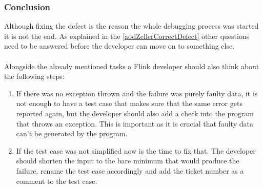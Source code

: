 \subsubsection{Conclusion}
Although fixing the defect is the reason the whole debugging process was started it is not the end. As explained in the \ref{aodZellerCorrectDefect} other questions need to be answered before the developer can move on to something else.

\paragraph{} Alongside the already mentioned tasks a Flink developer should also think about the following steps:
\begin{enumerate}
  \item If there was no exception thrown and the failure was purely faulty data, it is not enough to have a test case that makes sure that the same error gets reported again, but the developer should also add a check into the program that throws an exception. This is important as it is crucial that faulty data can't be generated by the program.
  \item If the test case was not simplified now is the time to fix that. The developer should shorten the input to the bare minimum that would produce the failure, rename the test case accordingly and add the ticket number as a comment to the test case.
\end{enumerate}
